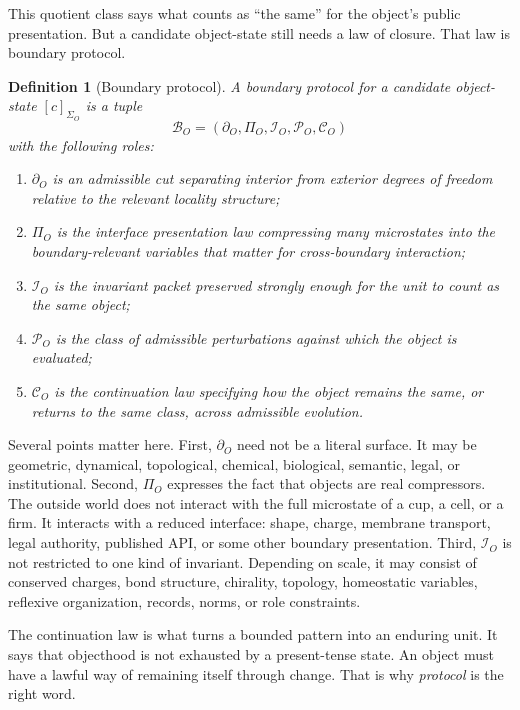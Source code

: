 \documentclass[11pt]{article}
\newtheorem{definition}{Definition}
\begin{document}
This quotient class says what counts as ``the same'' for the object's public presentation.
But a candidate object-state still needs a law of closure.
That law is boundary protocol.

\begin{definition}[Boundary protocol]
A boundary protocol for a candidate object-state $[c]_{\Sigma_O}$ is a tuple
\[
\mathcal{B}_O = (\partial_O,\Pi_O,\mathcal{I}_O,\mathcal{P}_O,\mathcal{C}_O)
\]
with the following roles:
\begin{enumerate}
    \item $\partial_O$ is an admissible cut separating interior from exterior degrees of freedom relative to the relevant locality structure;
    \item $\Pi_O$ is the interface presentation law compressing many microstates into the boundary-relevant variables that matter for cross-boundary interaction;
    \item $\mathcal{I}_O$ is the invariant packet preserved strongly enough for the unit to count as the same object;
    \item $\mathcal{P}_O$ is the class of admissible perturbations against which the object is evaluated;
    \item $\mathcal{C}_O$ is the continuation law specifying how the object remains the same, or returns to the same class, across admissible evolution.
\end{enumerate}
\end{definition}

Several points matter here.
First, $\partial_O$ need not be a literal surface.
It may be geometric, dynamical, topological, chemical, biological, semantic, legal, or institutional.
Second, $\Pi_O$ expresses the fact that objects are real compressors.
The outside world does not interact with the full microstate of a cup, a cell, or a firm.
It interacts with a reduced interface: shape, charge, membrane transport, legal authority, published API, or some other boundary presentation.
Third, $\mathcal{I}_O$ is not restricted to one kind of invariant.
Depending on scale, it may consist of conserved charges, bond structure, chirality, topology, homeostatic variables, reflexive organization, records, norms, or role constraints.

The continuation law is what turns a bounded pattern into an enduring unit.
It says that objecthood is not exhausted by a present-tense state.
An object must have a lawful way of remaining itself through change.
That is why \emph{protocol} is the right word.
\end{document}
